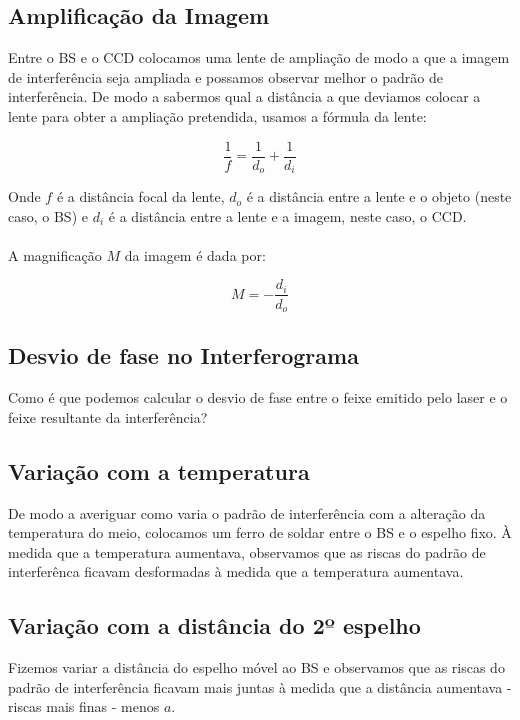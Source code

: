 \documentclass{article}
\begin{document}
\begin{multicols}{2}
\subsection{Amplificação da Imagem}

Entre o BS e o CCD colocamos uma lente de ampliação de modo a que a imagem de interferência seja ampliada e possamos observar melhor o padrão de interferência.
De modo a sabermos qual a distância a que deviamos colocar a lente para obter a ampliação pretendida, usamos a fórmula da lente:

\[ \frac{1}{f} = \frac{1}{d_o} + \frac{1}{d_i} \]

Onde $f$ é a distância focal da lente, $d_o$ é a distância entre a lente e o objeto (neste caso, o BS) e $d_i$ é a distância entre a lente e a imagem, neste caso, o CCD.
\paragraph{}
A magnificação $M$ da imagem é dada por:

\[ M = - \frac{d_i}{d_o} \]

\subsection{Desvio de fase no Interferograma}

Como é que podemos calcular o desvio de fase entre o feixe emitido pelo laser e o feixe resultante da interferência?

\subsection{Variação com a temperatura}

De modo a averiguar como varia o padrão de interferência com a alteração da temperatura do meio, colocamos um ferro de soldar entre o BS e o espelho fixo.
À medida que a temperatura aumentava, observamos que as riscas do padrão de interferênca ficavam desformadas à medida que a temperatura aumentava.

\subsection{Variação com a distância do 2º espelho}

Fizemos variar a distância do espelho móvel ao BS e observamos que as riscas do padrão de interferência ficavam mais juntas à medida que a distância aumentava - riscas mais finas - menos $a$.



\end{multicols}
\end{document}
